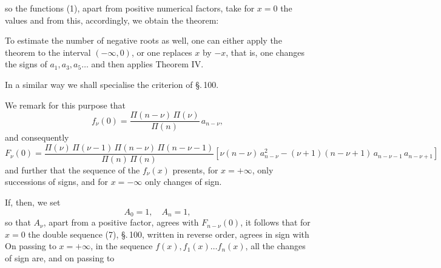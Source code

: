so the functions (1), apart from positive numerical factors, take for $x = 0$ the values
and from this, accordingly, we obtain the theorem:


To estimate the number of negative roots as well, one can either apply the  theorem to the interval $(-\infty, 0)$, or one replaces $x$ by $-x$, that is, one changes the signs of $a_1, a_3, a_5 \ldots$ and then applies Theorem IV.

In a similar way we shall specialise the  criterion of \S.\,100.

We remark for this purpose that
\[
f_\nu(0) = \frac{\Pi(n-\nu)\,\Pi(\nu)}{\Pi(n)}\, a_{n-\nu},
\]
and consequently
\[
F_\nu(0) = \frac{\Pi(\nu)\,\Pi(\nu-1)\,\Pi(n-\nu)\,\Pi(n-\nu-1)}{\Pi(n)\,\Pi(n)}\left[\nu(n-\nu)\,a_{n-\nu}^2 - (\nu+1)(n-\nu+1)\,a_{n-\nu-1}\,a_{n-\nu+1}\right]
\]
and further that the sequence of the $f_\nu(x)$ presents, for $x = +\infty$, only successions of signs, and for $x = -\infty$ only changes of sign.

If, then, we set
\[
A_0 = 1, \quad A_n = 1,
\]
so that $A_\nu$, apart from a positive factor, agrees with $F_{n-\nu}(0)$, it follows that for $x = 0$ the double sequence (7), \S.\,100, written in reverse order, agrees in sign with
On passing to $x = +\infty$, in the sequence $f(x), f_1(x) \ldots f_n(x)$, all the changes of sign are, and on passing to
